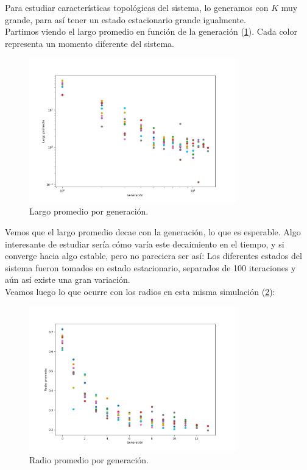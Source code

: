 \documentclass{article}
\begin{document}
Para estudiar características topológicas del sistema, lo generamos con $K$ muy grande, para así tener un estado estacionario
grande igualmente.\\
Partimos viendo el largo promedio en función de la generación (\ref{fig:largo_vs_gen}). Cada color representa un momento diferente del sistema.
\begin{figure}[h!]
    \centering
    \includegraphics[width=0.8\textwidth]{graficos_inst/largo_vs_gen.png}
    \caption{Largo promedio por generación.}
    \label{fig:largo_vs_gen}
\end{figure}
Vemos que el largo promedio decae con la generación, lo que es esperable. Algo interesante de estudiar sería cómo varía este decaimiento en el tiempo, 
y si converge hacia algo estable, pero no pareciera ser así: Los diferentes estados del sistema fueron tomados en estado estacionario, separados de 100 iteraciones y aún así existe una gran variación.\\

Veamos luego lo que ocurre con los radios en esta misma simulación (\ref{fig:radio_vs_gen}):
\begin{figure}[h!]
    \centering
    \includegraphics[width=0.8\textwidth]{graficos_inst/radio_vs_gen.png}
    \caption{Radio promedio por generación.}
    \label{fig:radio_vs_gen}
\end{figure}
\end{document}
